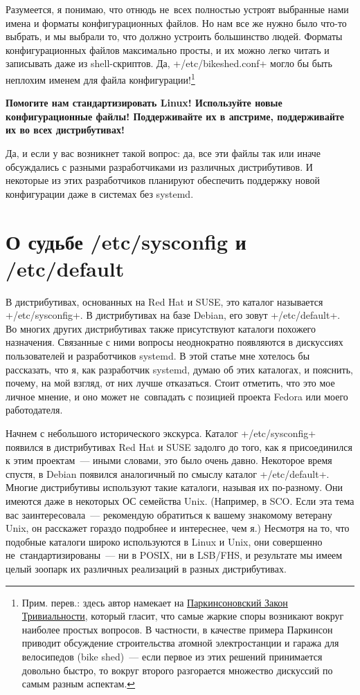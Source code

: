 \documentclass[10pt,oneside,a4paper]{article}
\begin{document}
Разумеется, я понимаю, что отнюдь не~всех полностью устроят выбранные нами имена
и форматы конфигурационных файлов. Но нам все же нужно было что-то выбрать, и мы
выбрали то, что должно устроить большинство людей. Форматы конфигурационных
файлов максимально просты, и их можно легко читать и записывать даже из
shell-скриптов. Да, +/etc/bikeshed.conf+ могло бы быть неплохим именем
для файла конфигурации!\footnote{Прим. перев.: здесь автор намекает на
\href{http://en.wikipedia.org/wiki/Parkinson's_Law_of_Triviality}{Паркинсоновский
Закон Тривиальности}, который гласит, что самые жаркие споры возникают вокруг
наиболее простых вопросов. В частности, в качестве примера Паркинсон приводит
обсуждение строительства атомной электростанции и гаража для велосипедов (bike
shed)~--- если первое из этих решений принимается довольно быстро, то вокруг
второго разгорается множество дискуссий по самым разным аспектам.}

\textbf{Помогите нам стандартизировать Linux! Используйте новые конфигурационные
файлы! Поддерживайте их в апстриме, поддерживайте их во всех дистрибутивах!}

Да, и если у вас возникнет такой вопрос: да, все эти файлы так или иначе
обсуждались с разными разработчиками из различных дистрибутивов. И некоторые из
этих разработчиков планируют обеспечить поддержку новой конфигурации даже в
системах без systemd.

\section{О судьбе /etc/sysconfig и /etc/default}

В дистрибутивах, основанных на Red Hat и SUSE, это каталог называется
+/etc/sysconfig+. В дистрибутивах на базе Debian, его зовут +/etc/default+.
Во многих других дистрибутивах также присутствуют каталоги похожего назначения.
Связанные с ними вопросы неоднократно появляются в дискуссиях пользователей и
разработчиков systemd. В этой статье мне хотелось бы рассказать, что я, как
разработчик systemd, думаю об этих каталогах, и пояснить, почему, на мой взгляд,
от них лучше отказаться. Стоит отметить, что это мое личное мнение, и оно
может не~совпадать с позицией проекта Fedora или моего работодателя.

Начнем с небольшого исторического экскурса. Каталог +/etc/sysconfig+ появился в
дистрибутивах Red Hat и SUSE задолго до того, как я присоединился к этим
проектам~--- иными словами, это было очень давно. 
Некоторое время спустя, в Debian появился аналогичный по смыслу каталог
+/etc/default+. Многие дистрибутивы используют такие каталоги, называя их
по-разному. Они имеются даже в некоторых ОС семейства Unix. (Например, в SCO.
Если эта тема вас заинтересовала~--- рекомендую обратиться к вашему знакомому
ветерану Unix, он расскажет гораздо подробнее и интереснее, чем я.) Несмотря на
то, что подобные каталоги широко используются в Linux и Unix, они совершенно
не~стандартизированы~--- ни в POSIX, ни в LSB/FHS, и результате мы имеем целый
зоопарк их различных реализаций в разных дистрибутивах.
\end{document}
